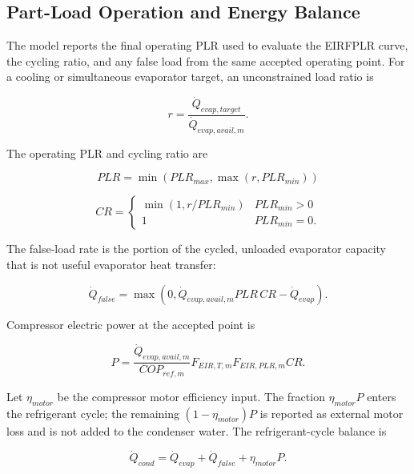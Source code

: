 \subsection{Part-Load Operation and Energy Balance}
\label{part-load-operation-and-energy-balance}

The model reports the final operating PLR used to evaluate the EIRFPLR curve, the cycling ratio, and any false load from the same accepted operating point. For a cooling or simultaneous evaporator target, an unconstrained load ratio is

\begin{equation}
r=\frac{\dot Q_{evap,target}}{\dot Q_{evap,avail,m}}.
\end{equation}

The operating PLR and cycling ratio are

\begin{equation}
PLR=\min\left(PLR_{max},\max\left(r,PLR_{min}\right)\right)
\end{equation}

\begin{equation}
CR=\begin{cases}
\min\left(1,r/PLR_{min}\right) & PLR_{min}>0 \\
1 & PLR_{min}=0.
\end{cases}
\end{equation}

The false-load rate is the portion of the cycled, unloaded evaporator capacity that is not useful evaporator heat transfer:

\begin{equation}
\dot Q_{false}=\max\left(0,\dot Q_{evap,avail,m}PLR\,CR-\dot Q_{evap}\right).
\end{equation}

Compressor electric power at the accepted point is

\begin{equation}
P=\frac{\dot Q_{evap,avail,m}}{COP_{ref,m}}F_{EIR,T,m}F_{EIR,PLR,m}CR.
\end{equation}

Let \(\eta_{motor}\) be the compressor motor efficiency input. The fraction \(\eta_{motor}P\) enters the refrigerant cycle; the remaining \((1-\eta_{motor})P\) is reported as external motor loss and is not added to the condenser water. The refrigerant-cycle balance is

\begin{equation}
\dot Q_{cond}=\dot Q_{evap}+\dot Q_{false}+\eta_{motor}P.
\end{equation}

